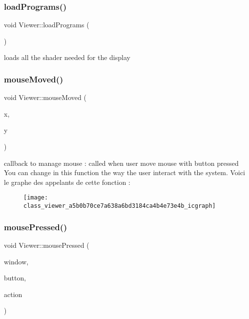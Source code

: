 \subsubsection{\texorpdfstring{load\+Programs()}{loadPrograms()}}
{\footnotesize\ttfamily void Viewer\+::load\+Programs (\begin{DoxyParamCaption}{ }\end{DoxyParamCaption})}



loads all the shader needed for the display 

\mbox{\label{class_viewer_a5b0b70ce7a638a6bd3184ca4b4e73e4b}} 
\subsubsection{\texorpdfstring{mouse\+Moved()}{mouseMoved()}}
{\footnotesize\ttfamily void Viewer\+::mouse\+Moved (\begin{DoxyParamCaption}\item[{int}]{x,  }\item[{int}]{y }\end{DoxyParamCaption})}

callback to manage mouse \+: called when user move mouse with button pressed You can change in this function the way the user interact with the system. Voici le graphe des appelants de cette fonction \+:\nopagebreak
\begin{figure}[H]
\begin{center}
\leavevmode
\texttt{[image: class\_viewer\_a5b0b70ce7a638a6bd3184ca4b4e73e4b\_icgraph]}
\end{center}
\end{figure}
\mbox{\label{class_viewer_ac2e3964b994ed24680586369b2b7a750}} 
\subsubsection{\texorpdfstring{mouse\+Pressed()}{mousePressed()}}
{\footnotesize\ttfamily void Viewer\+::mouse\+Pressed (\begin{DoxyParamCaption}\item[{G\+L\+F\+Wwindow $\ast$}]{window,  }\item[{int}]{button,  }\item[{int}]{action }\end{DoxyParamCaption})}

